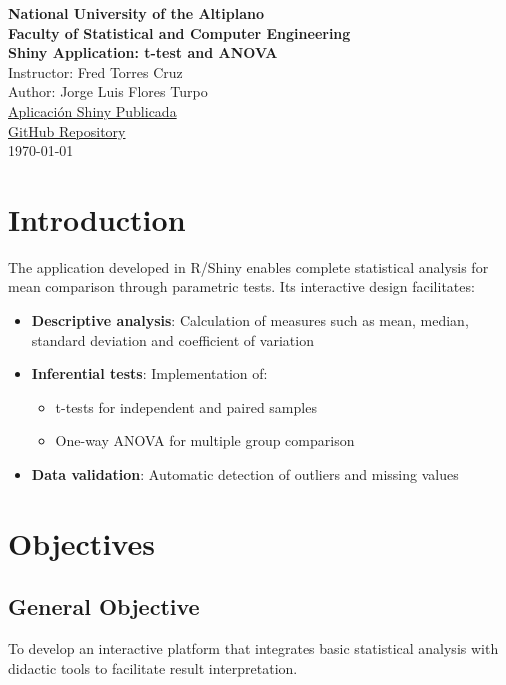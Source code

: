 \documentclass[12pt]{article}
\begin{document}
\begin{center}
    \textbf{\large National University of the Altiplano} \\
    \textbf{Faculty of Statistical and Computer Engineering} \\[5mm]
    \textbf{Shiny Application: t-test and ANOVA} \\[3mm]
    Instructor: Fred Torres Cruz \\
    Author: Jorge Luis Flores Turpo \\[3mm]
    \href{https://yorchisyorch.shinyapps.io/Aplicacion_Shany/}{Aplicación Shiny Publicada} \\[3mm]
    \href{https://github.com/Yorchisflrs/aplicacion_anova_en_R.git}{GitHub Repository} \\
    \today
\end{center}

\section{Introduction}
The application developed in R/Shiny enables complete statistical analysis for mean comparison through parametric tests. Its interactive design facilitates:

\begin{itemize}
    \item \textbf{Descriptive analysis}: Calculation of measures such as mean, median, standard deviation and coefficient of variation
    \item \textbf{Inferential tests}: Implementation of:
    \begin{itemize}
        \item t-tests for independent and paired samples
        \item One-way ANOVA for multiple group comparison
    \end{itemize}
    \item \textbf{Data validation}: Automatic detection of outliers and missing values
\end{itemize}

\section{Objectives}
\subsection{General Objective}
To develop an interactive platform that integrates basic statistical analysis with didactic tools to facilitate result interpretation.
\end{document}
